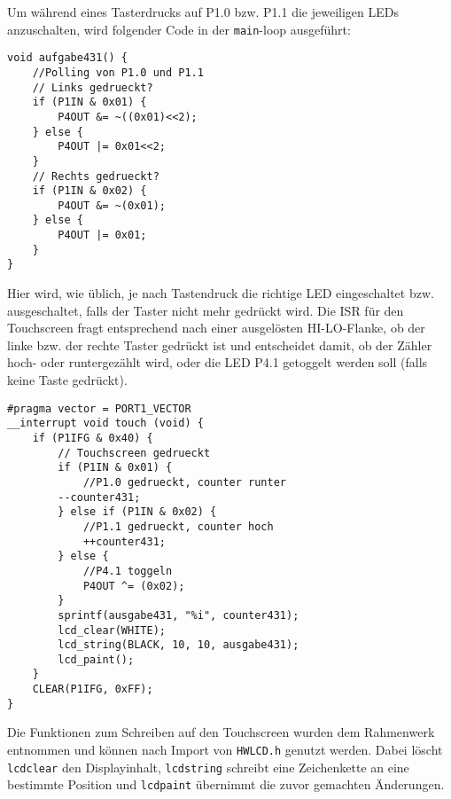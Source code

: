 \documentclass[11pt,a4paper,ngerman]{article}
\begin{document}
\begin{description}
Um während eines Tasterdrucks auf P1.0 bzw. P1.1 die jeweiligen LEDs anzuschalten, wird folgender Code in der \texttt{main}-loop ausgeführt:

\begin{lstlisting}
void aufgabe431() {
	//Polling von P1.0 und P1.1
	// Links gedrueckt?
	if (P1IN & 0x01) {
		P4OUT &= ~((0x01)<<2);
	} else {
		P4OUT |= 0x01<<2;
	} 
	// Rechts gedrueckt?
	if (P1IN & 0x02) {
		P4OUT &= ~(0x01);
	} else {
		P4OUT |= 0x01;
	}
}
\end{lstlisting}

Hier wird, wie üblich, je nach Tastendruck die richtige LED eingeschaltet bzw. ausgeschaltet, falls der Taster nicht mehr gedrückt wird.
\newpage
Die ISR für den Touchscreen fragt entsprechend nach einer ausgelösten HI-LO-Flanke, ob der linke bzw. der rechte Taster gedrückt ist und entscheidet damit, ob der Zähler hoch- oder runtergezählt wird, oder die LED P4.1 getoggelt werden soll (falls keine Taste gedrückt).
\begin{lstlisting}
#pragma vector = PORT1_VECTOR
__interrupt void touch (void) {
	if (P1IFG & 0x40) {
		// Touchscreen gedrueckt
		if (P1IN & 0x01) {
			//P1.0 gedrueckt, counter runter
  		--counter431;
		} else if (P1IN & 0x02) {
			//P1.1 gedrueckt, counter hoch
			++counter431;
		} else {
			//P4.1 toggeln
			P4OUT ^= (0x02);
		}
		sprintf(ausgabe431, "%i", counter431);
		lcd_clear(WHITE);
		lcd_string(BLACK, 10, 10, ausgabe431);
		lcd_paint();
	}
	CLEAR(P1IFG, 0xFF);
}
\end{lstlisting}

Die Funktionen zum Schreiben auf den Touchscreen wurden dem Rahmenwerk entnommen und können nach Import von \texttt{HW\textunderscore LCD.h} genutzt werden.
Dabei löscht \texttt{lcd\textunderscore clear} den Displayinhalt, \texttt{lcd\textunderscore  string} schreibt eine Zeichenkette an eine bestimmte Position und \texttt{lcd\textunderscore paint} übernimmt die zuvor gemachten Änderungen.
\end{description}

\label{LastPage}
\end{document}
